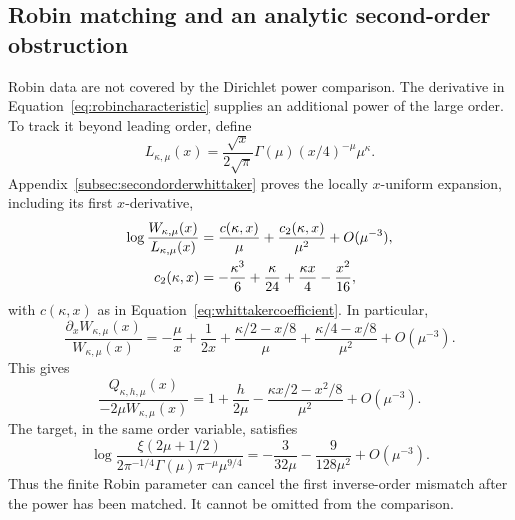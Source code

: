 \documentclass[11pt,letterpaper]{article}
\numberwithin{equation}{section}
\theoremstyle{definition}
\theoremstyle{remark}
\begin{document}
\subsection{Robin matching and an analytic second-order obstruction}
\label{subsec:robinexclusion}
Robin data are not covered by the Dirichlet power comparison. The derivative in Equation~\eqref{eq:robincharacteristic} supplies an additional power of the large order. To track it beyond leading order, define
\begin{equation}
 L_{\kappa,\mu}(x)=\frac{\sqrt x}{2\sqrt\pi}
                    \Gamma(\mu)(x/4)^{-\mu}\mu^\kappa.
 \label{eq:whittakerleadingfactor}
\end{equation}
Appendix~\ref{subsec:secondorderwhittaker} proves the locally $x$-uniform expansion, including its first $x$-derivative,
\begin{align}
 \log\frac{W_{\kappa,\mu}(x)}{L_{\kappa,\mu}(x)}
 &=\frac{c(\kappa,x)}{\mu}+\frac{c_2(\kappa,x)}{\mu^2}
   +O(\mu^{-3}),\notag\\
 c_2(\kappa,x)&=-\frac{\kappa^3}{6}+\frac{\kappa}{24}
                  +\frac{\kappa x}{4}-\frac{x^2}{16},
 \label{eq:whittakerlogsecond}
\end{align}
with $c(\kappa,x)$ as in Equation~\eqref{eq:whittakercoefficient}. In particular,
\begin{equation}
 \frac{\partial_xW_{\kappa,\mu}(x)}{W_{\kappa,\mu}(x)}
 =-\frac\mu x+\frac1{2x}
   +\frac{\kappa/2-x/8}{\mu}
   +\frac{\kappa/4-x/8}{\mu^2}+O(\mu^{-3}).
 \label{eq:whittakerlogderivative}
\end{equation}
This gives
\begin{equation}
 \frac{Q_{\kappa,h,\mu}(x)}{-2\mu W_{\kappa,\mu}(x)}
 =1+\frac{h}{2\mu}
     -\frac{\kappa x/2-x^2/8}{\mu^2}+O(\mu^{-3}).
 \label{eq:robinprefactor}
\end{equation}
The target, in the same order variable, satisfies
\begin{equation}
 \log\frac{\xi(2\mu+1/2)}
 {2\pi^{-1/4}\Gamma(\mu)\pi^{-\mu}\mu^{9/4}}
 =-\frac3{32\mu}-\frac9{128\mu^2}+O(\mu^{-3}).
 \label{eq:xilogsecond}
\end{equation}
Thus the finite Robin parameter can cancel the first inverse-order mismatch after the power has been matched. It cannot be omitted from the comparison.
\end{document}
